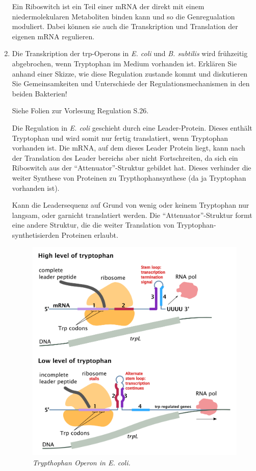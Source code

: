 \begin{enumerate}
		Ein Riboswitch ist ein Teil einer mRNA der direkt mit einem niedermolekularen Metaboliten binden kann
		und so die Genregualation moduliert.
		Dabei können sie auch die Transkription und Translation der eigenen mRNA regulieren.

	\item Die Transkription der trp-Operons in \emph{E. coli} und \emph{B. subtilis} wird frühzeitig abgebrochen, wenn Tryptophan im Medium vorhanden ist. Erklären Sie anhand einer Skizze, wie diese Regulation zustande kommt und diskutieren Sie Gemeinsamkeiten und Unterschiede der Regulationsmechanismen in den beiden Bakterien!

		Siehe Folien zur Vorlesung Regulation S.26.

		Die Regulation in \emph{E. coli} geschieht durch eine Leader-Protein.
		Dieses enthält Tryptophan und wird somit nur fertig translatiert,
		wenn Tryptophan vorhanden ist.
		Die mRNA, auf dem dieses Leader Protein liegt,
		kann nach der Translation des Leader bereichs aber nicht Fortschreiten,
		da sich ein Riboswitch aus der ``Attenuator''-Struktur gebildet hat.
		Dieses verhinder die weiter Synthese von Proteinen zu Trypthophansynthese (da ja Tryptophan vorhanden ist).

		Kann die Leadersequenz auf Grund von wenig oder keinem Tryptophan nur langsam,
		oder garnicht translatiert werden.
		Die ``Attenuator''-Struktur formt eine andere Struktur,
		die die weiter Translation von Tryptophan-synthetisierden Proteinen erlaubt.
		
		\begin{figure}[ht!]
		\leavevmode
		\begin{center}
		\includegraphics[scale=0.32]{./pictures/trp_operon_1000}
		\end{center}
		\caption{\slshape{Trypthophan Operon in \emph{E. coli}.}}
		\label{fig:trpoperon}
		\end{figure}

\end{enumerate}
